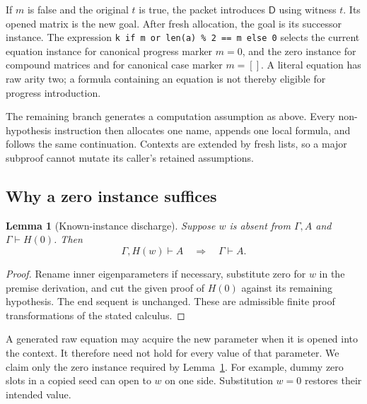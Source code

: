 \documentclass[11pt,letterpaper]{article}
\newtheorem{lemma}[theorem]{Lemma}
\theoremstyle{definition}\newtheorem{definition}[theorem]{Definition}
\theoremstyle{remark}\newtheorem{remark}[theorem]{Remark}
\newcommand{\D}{\mathsf D}
\begin{document}
If $m$ is false and the original $t$ is true, the packet introduces
$\D$ using witness $t$. Its opened matrix is the new goal. After
fresh allocation, the goal is its successor instance. The expression
\texttt{k if m or len(a) \% 2 == m else 0} selects the current equation
instance for canonical progress marker $m=0$, and the zero instance for
compound matrices and for canonical case marker $m=[]$. A literal
equation has raw arity two; a formula containing an equation is not
thereby eligible for progress introduction.

The remaining branch generates a computation assumption as above.
Every non-hypothesis instruction then allocates one name, appends one
local formula, and follows the same continuation. Contexts are extended
by fresh lists, so a major subproof cannot mutate its caller's retained
assumptions.

\subsection{Why a zero instance suffices}

\begin{lemma}[Known-instance discharge]\label{lem:checker-known-instance}
Suppose $w$ is absent from $\Gamma,A$ and
$\Gamma\vdash H(0)$. Then
\[
          \Gamma,H(w)\vdash A\quad\Longrightarrow\quad\Gamma\vdash A.
\]
\end{lemma}
\begin{proof}
Rename inner eigenparameters if necessary, substitute zero for $w$ in
the premise derivation, and cut the given proof of $H(0)$ against its
remaining hypothesis. The end sequent is unchanged. These are admissible
finite proof transformations of the stated calculus.
\end{proof}

A generated raw equation may acquire the new parameter when it is
opened into the context. It therefore need not hold for every value of
that parameter. We claim only the zero instance required by
Lemma~\ref{lem:checker-known-instance}. For example, dummy zero slots
in a copied seed can open to $w$ on one side. Substitution $w=0$
restores their intended value.
\end{document}
